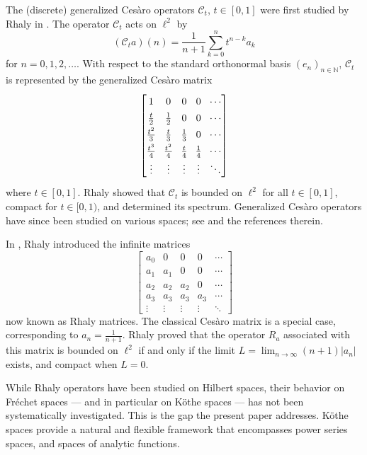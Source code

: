 \documentclass{birkjour}
\theoremstyle{definition}
\theoremstyle{remark}
\numberwithin{equation}{section}
\begin{document}
The (discrete) generalized Ces\`{a}ro operators $\mathcal{C}_{t}$, $t\in \left[0,1\right]$ were first studied by Rhaly in \cite{R1, R2}. The operator $\mathcal{C}_{t}$ acts on  $\ell^{2}$ by
$$(\mathcal{C}_{t}a)(n)=\frac{1}{n+1}\sum^{n}_{k=0} t^{n-k}a_{k}$$
for $n=0,1,2,\dots$.
With respect to the standard orthonormal basis $(e_n)_{n\in\mathbb{N}}$, 
$\mathcal{C}_t$ is represented by the generalized Ces\`{a}ro matrix
\begin{equation}
\renewcommand{\arraystretch}{1.4}
\setlength{\arraycolsep}{4pt}
\begin{bmatrix}
1 & 0 & 0 & 0 & \cdots \\
\frac{t}{2} & \frac{1}{2} & 0 & 0 & \cdots \\
\frac{t^2}{3} & \frac{t}{3} & \frac{1}{3} & 0 & \cdots \\
\frac{t^3}{4} & \frac{t^2}{4} & \frac{t}{4} & \frac{1}{4} & \cdots \\
\vdots & \vdots & \vdots & \vdots & \ddots
\end{bmatrix}
\renewcommand{\arraystretch}{1.0}
\setlength{\arraycolsep}{5pt}
\end{equation}
where $t\in[0,1]$. Rhaly \cite{R1} showed that $\mathcal{C}_t$ is bounded on $\ell^2$ for 
all $t\in[0,1]$, compact for $t\in[0,1)$, and determined its spectrum. 
Generalized Ces\`{a}ro operators have since been studied on various spaces; 
see \cite{ABR9,ABR8} and the references therein.


In \cite{R3}, Rhaly introduced the infinite matrices
\begin{equation}
\begin{bmatrix}
a_{0} &0&0&0&\cdots \\
a_{1}&a_{1}&0&0&\cdots\\
a_{2}&a_{2}&a_{2}&0&\cdots\\
a_{3}&a_{3}&a_{3}&a_{3}&\cdots\\
\vdots&\vdots&\vdots&\vdots&\ddots
\end{bmatrix}
\end{equation} 
now known as Rhaly matrices. The classical Ces\`{a}ro matrix is a special 
case, corresponding to $\displaystyle a_n=\frac{1}{n+1}$. Rhaly \cite{R3} proved that the operator $R_a$ associated with this matrix 
is bounded on $\ell^2$ if and only if the limit $L=\lim_{n\to\infty}(n+1)|a_n|$ 
exists, and compact when $L=0$.


While Rhaly operators have been studied on Hilbert spaces, 
their behavior on Fréchet spaces — and in particular on Köthe 
spaces — has not been systematically investigated. This is the gap the 
present paper addresses. Köthe spaces provide a natural and flexible 
framework that encompasses power series spaces, 
and spaces of analytic functions.
\end{document}
